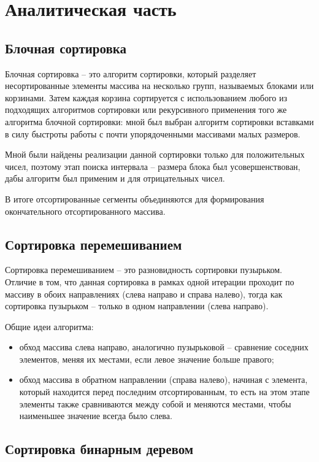 \chapter{Аналитическая часть}

\section{Блочная сортировка}

Блочная сортировка \cite{bucket} -- это алгоритм сортировки, который разделяет несортированные элементы массива на несколько групп, называемых блоками или корзинами. Затем каждая корзина сортируется с использованием любого из подходящих алгоритмов сортировки или рекурсивного применения того же алгоритма блочной сортировки: мной был выбран алгоритм сортировки вставками в силу быстроты работы с почти упорядоченными массивами малых размеров. 

Мной были найдены реализации данной сортировки только для положительных чисел, поэтому этап поиска интервала -- размера блока был усовершенствован, дабы алгоритм был применим и для отрицательных чисел. 

В итоге отсортированные сегменты объединяются для формирования окончательного отсортированного массива.

\section{Сортировка перемешиванием}

Сортировка перемешиванием \cite{shaker} -- это разновидность сортировки пузырьком. Отличие в том, что данная сортировка в рамках одной итерации проходит по массиву в обоих направлениях (слева направо и справа налево), тогда как сортировка пузырьком -- только в одном направлении (слева направо).

Общие идеи алгоритма:
\begin{itemize}
	\item обход массива слева направо, аналогично пузырьковой -- сравнение соседних элементов, меняя их местами, если левое значение больше правого;
	\item обход массива в обратном направлении (справа налево), начиная с элемента, который находится перед последним отсортированным, то есть на этом этапе элементы также сравниваются между собой и меняются местами, чтобы наименьшее значение всегда было слева.
\end{itemize}

\section{Сортировка бинарным деревом}

